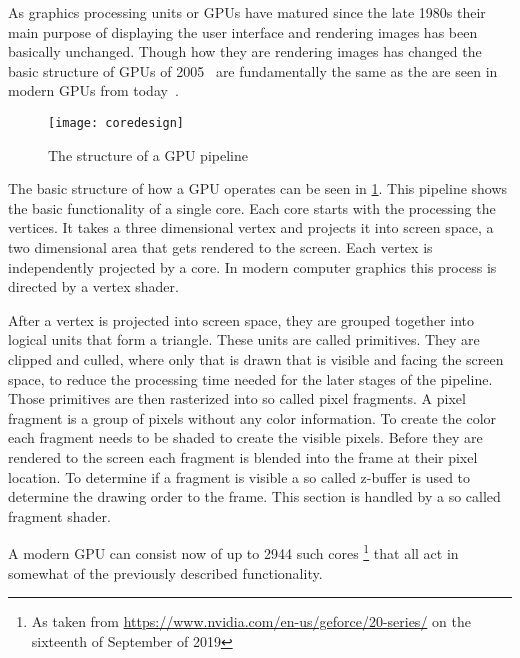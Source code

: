 
As graphics processing units or GPUs have matured since the late 1980s their main purpose of displaying the user interface and rendering images has been basically unchanged. Though how they are rendering images has changed the basic structure of GPUs of 2005~\cite{kilgariff2005geforce} are fundamentally the same as the are seen in modern GPUs from today~\cite{nvidia2018turing}.

\begin{figure}[H]
	\centering
	\texttt{[image: coredesign]}
	\caption{The structure of a GPU pipeline}
	\label{img:gpuPipe}
\end{figure}

The basic structure of how a GPU operates can be seen in \cref{img:gpuPipe}. This pipeline shows the basic functionality of a single core. Each core starts with the processing the vertices. It takes a three dimensional vertex and projects it into screen space, a two dimensional area that gets rendered to the screen. Each vertex is independently projected by a core. In modern computer graphics this process is directed by a vertex shader.

After a vertex is projected into screen space, they are grouped together into logical units that form a triangle. These units are called primitives. They are clipped and culled, where only that is drawn that is visible and facing the screen space, to reduce the processing time needed for the later stages of the pipeline. Those primitives are then rasterized into so called pixel fragments. A pixel fragment is a group of pixels without any color information. To create the color each fragment needs to be shaded to create the visible pixels. Before they are rendered to the screen each fragment is blended into the frame at their pixel location. To determine if a fragment is visible a so called z-buffer is used to determine the drawing order to the frame. This section is handled by a so called fragment shader. 

A modern GPU can consist now of up to 2944 such cores \footnote{As taken from \url{https://www.nvidia.com/en-us/geforce/20-series/} on the sixteenth of September of 2019} that all act in somewhat of the previously described functionality.
